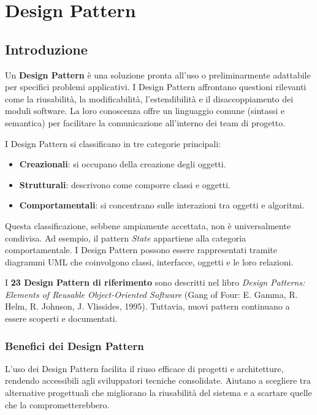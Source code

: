 \chapter{Design Pattern}

\section{Introduzione}

Un \textbf{Design Pattern} è una soluzione pronta all’uso o preliminarmente adattabile per specifici problemi applicativi. I Design Pattern affrontano questioni rilevanti come la riusabilità, la modificabilità, l’estendibilità e il disaccoppiamento dei moduli software. La loro conoscenza offre un linguaggio comune (sintassi e semantica) per facilitare la comunicazione all’interno dei team di progetto.

I Design Pattern si classificano in tre categorie principali:
\begin{itemize}
    \item \textbf{Creazionali}: si occupano della creazione degli oggetti.
    \item \textbf{Strutturali}: descrivono come comporre classi e oggetti.
    \item \textbf{Comportamentali}: si concentrano sulle interazioni tra oggetti e algoritmi.
\end{itemize}

Questa classificazione, sebbene ampiamente accettata, non è universalmente condivisa. Ad esempio, il pattern \textit{State} appartiene alla categoria comportamentale. I Design Pattern possono essere rappresentati tramite diagrammi UML che coinvolgono classi, interfacce, oggetti e le loro relazioni.

I \textbf{23 Design Pattern di riferimento} sono descritti nel libro \textit{Design Patterns: Elements of Reusable Object-Oriented Software} (Gang of Four: E. Gamma, R. Helm, R. Johnson, J. Vlissides, 1995). Tuttavia, nuovi pattern continuano a essere scoperti e documentati.

\subsection{Benefici dei Design Pattern}
L’uso dei Design Pattern facilita il riuso efficace di progetti e architetture, rendendo accessibili agli sviluppatori tecniche consolidate. Aiutano a scegliere tra alternative progettuali che migliorano la riusabilità del sistema e a scartare quelle che la comprometterebbero.

